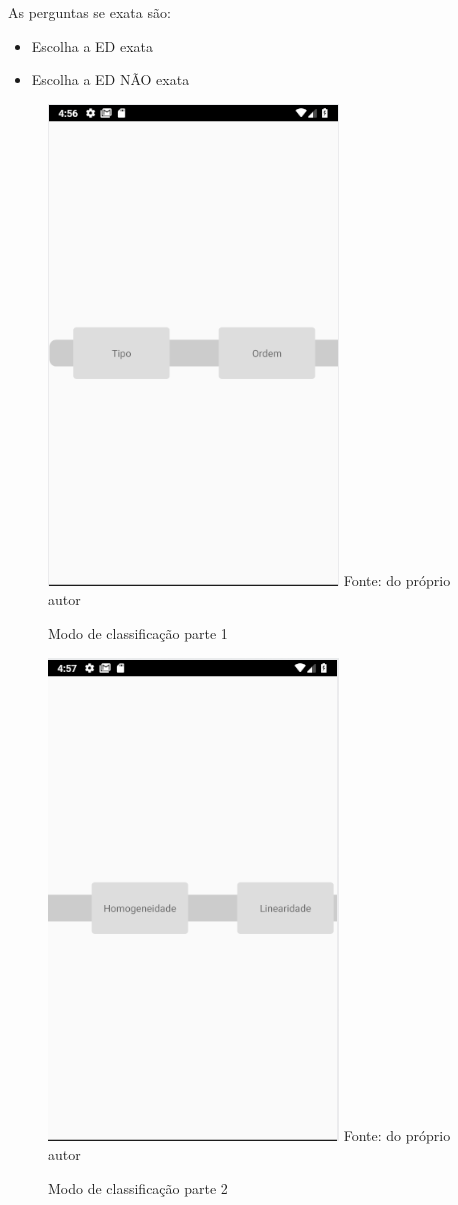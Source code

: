 As perguntas se exata são:
\begin{itemize}
	\item{}Escolha a ED exata
	\item{}Escolha a ED NÃO exata
\end{itemize} 

\begin{figure}[H]
\centering
\caption{Modo de classificação parte 1}
\includegraphics[scale=0.72]{figuras/modo_classificacao_1.png}
\small{Fonte: do próprio autor}
\end{figure}

\begin{figure}[H]
\centering
\caption{Modo de classificação parte 2}
\includegraphics[scale=0.72]{figuras/modo_classificacao_2.png}
\small{Fonte: do próprio autor}
\end{figure}

